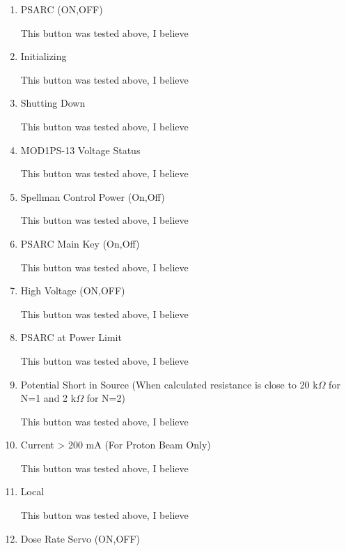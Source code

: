 \documentclass[11pt]{book}		%
\begin{document}
\begin{enumerate}
 \item PSARC (ON,OFF)

\color{red}
This button was tested above, I believe
\color{black}

 \item Initializing

\color{red}
This button was tested above, I believe
\color{black}

 \item Shutting Down

\color{red}
This button was tested above, I believe
\color{black}

 \item MOD1PS-13 Voltage Status

\color{red}
This button was tested above, I believe
\color{black}

 \item Spellman Control Power (On,Off)

\color{red}
This button was tested above, I believe
\color{black}

 \item PSARC Main Key (On,Off)

\color{red}
This button was tested above, I believe
\color{black}

 \item High Voltage (ON,OFF)

\color{red}
This button was tested above, I believe
\color{black}

 \item PSARC at Power Limit

\color{red}
This button was tested above, I believe
\color{black}

 \item Potential Short in Source (When calculated resistance is close to 20 k$\Omega$ for N=1 and 2 k$\Omega$ for N=2)

\color{red}
This button was tested above, I believe
\color{black}

 \item Current > 200 mA (For Proton Beam Only)

\color{red}
This button was tested above, I believe
\color{black}

 \item Local

\color{red}
This button was tested above, I believe
\color{black}

 \item Dose Rate Servo (ON,OFF)


\end{enumerate}
\end{document}
